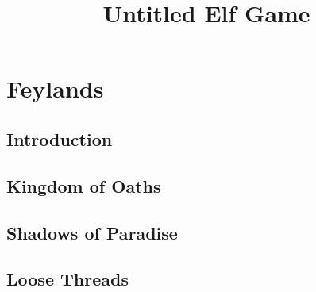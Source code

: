 \documentclass[a4paper,openany]{book}
\title{Untitled Elf Game}
\begin{document}
%

\glsunsetall

\label{mainGlossary}
\printglossary[
  style=topicmcols,
  nonumberlist,
  ]

\label{mechanicsGlossary}
\printglossary[
  type=mech,
  style=topicmcols,
  nonumberlist,
  ]

\printglossary[
  type=people,
  style=topicmcols,
  nonumberlist,
  ]

\mainmatter
\glsresetall

\chapter{Feylands}

\section{Introduction}

\begin{multicols}{2}



\end{multicols}

\section{Kingdom of Oaths}

\begin{multicols}{2}



\end{multicols}

\section{Shadows of Paradise}

\begin{multicols}{2}





\end{multicols}

\section{Loose Threads}

\begin{multicols}{2}







\stopcontents[sq]

\end{multicols}

%



\begin{multicols}{2}



\end{multicols}

\backmatter

\cleardoublepage
\end{document}
